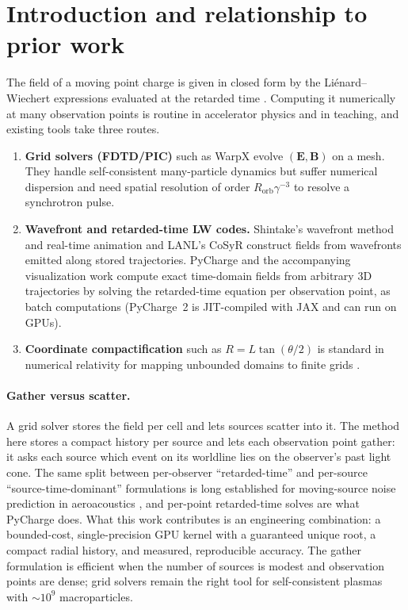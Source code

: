 \documentclass[11pt, a4paper]{article}
\begin{document}
\section{Introduction and relationship to prior work}

The field of a moving point charge is given in closed form by the Li\'enard--Wiechert expressions evaluated at the retarded time \cite{jackson1999}. Computing it numerically at many observation points is routine in accelerator physics and in teaching, and existing tools take three routes.
\begin{enumerate}
    \item \textbf{Grid solvers (FDTD/PIC)} such as WarpX \cite{vay2018} evolve $(\mathbf{E}, \mathbf{B})$ on a mesh. They handle self-consistent many-particle dynamics but suffer numerical dispersion and need spatial resolution of order $R_{\text{orb}}\gamma^{-3}$ to resolve a synchrotron pulse.
    \item \textbf{Wavefront and retarded-time LW codes.} Shintake's wavefront method and real-time animation \cite{shintake2003} and LANL's CoSyR \cite{huang2021} construct fields from wavefronts emitted along stored trajectories. PyCharge \cite{pycharge2022} and the accompanying visualization work \cite{filipovich2021} compute exact time-domain fields from arbitrary 3D trajectories by solving the retarded-time equation per observation point, as batch computations (PyCharge~2 is JIT-compiled with JAX and can run on GPUs).
    \item \textbf{Coordinate compactification} such as $R = L\tan(\theta/2)$ is standard in numerical relativity for mapping unbounded domains to finite grids \cite{zenginoglu2008}.
\end{enumerate}

\paragraph{Gather versus scatter.} A grid solver stores the field per cell and lets sources scatter into it. The method here stores a compact history per source and lets each observation point gather: it asks each source which event on its worldline lies on the observer's past light cone. The same split between per-observer ``retarded-time'' and per-source ``source-time-dominant'' formulations is long established for moving-source noise prediction in aeroacoustics \cite{brentner1996, brentner1997}, and per-point retarded-time solves are what PyCharge does. What this work contributes is an engineering combination: a bounded-cost, single-precision GPU kernel with a guaranteed unique root, a compact radial history, and measured, reproducible accuracy. The gather formulation is efficient when the number of sources is modest and observation points are dense; grid solvers remain the right tool for self-consistent plasmas with $\sim\!10^9$ macroparticles.
\end{document}
